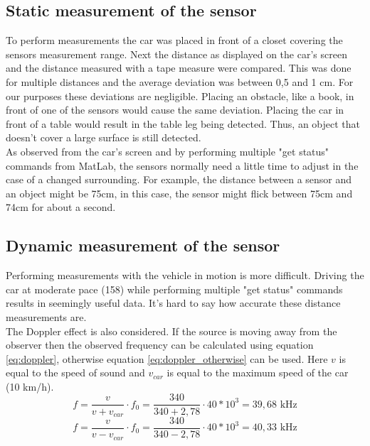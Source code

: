 \documentclass[final]{scrreprt} %
\begin{document}
\subsection{Static measurement of the sensor}

To perform measurements the car was placed in front of a closet covering the sensors measurement range. 
Next the distance as displayed on the car's screen and the distance measured with a tape measure were compared. 
This was done for multiple distances and the average deviation was between 0,5 and 1 cm. 
For our purposes these deviations are negligible. 
Placing an obstacle, like a book, in front of one of the sensors would cause the same deviation.
Placing the car in front of a table would result in the table leg being detected. 
Thus, an object that doesn't cover a large surface is still detected.\\ 
As observed from the car's screen and by performing multiple "get status" commands from MatLab, the sensors normally need a little time to adjust in the case of a changed surrounding. 
For example, the distance between a sensor and an object might be 75cm, in this case, the sensor might flick between 75cm and 74cm for about a second.


\subsection{Dynamic measurement of the sensor}

Performing measurements with the vehicle in motion is more difficult. Driving the car at moderate pace (158) while performing multiple "get status" commands results in seemingly useful data. It's hard to say how accurate these distance measurements are.\\ The Doppler effect is also considered. If the source is moving away from the observer then the observed frequency can be calculated using equation \ref{eq:doppler}, otherwise equation \ref{eq:doppler_otherwise} can be used. Here $v$ is equal to the speed of sound and $v_{car}$ is equal to the maximum speed of the car (10 km/h).
\begin{equation} 
\label{eq:doppler}
f = \dfrac{v}{v+v_{car}} \cdot f_{0} = \dfrac{340}{340 + 2,78} \cdot {40*10^3} = 39,68 \text{ kHz}
\end{equation}
\begin{equation} 
\label{eq:doppler_otherwise}
f = \dfrac{v}{v-v_{car}} \cdot f_{0} = \dfrac{340}{340 - 2,78} \cdot {40*10^3} = 40,33 \text{ kHz}
\end{equation}
\end{document}
